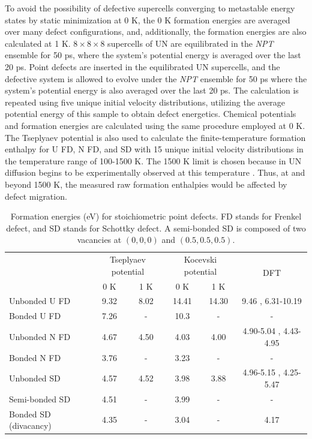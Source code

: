\documentclass[preprint, 12pt]{elsarticle}
\begin{document}
To avoid the possibility of defective supercells converging to metastable energy states by static minimization at 0 K, the 0 K formation energies are averaged over many defect configurations, and, additionally, the formation energies are also calculated at 1 K. $8 \times 8 \times 8$ supercells of UN are equilibrated in the \textit{NPT} ensemble for 50 ps, where the system's potential energy is averaged over the last 20 ps. Point defects are inserted in the equilibrated UN supercells, and the defective system is allowed to evolve under the \textit{NPT} ensemble for 50 ps where the system's potential energy is also averaged over the last 20 ps. The calculation is repeated using five unique initial velocity distributions, utilizing the average potential energy of this sample to obtain defect energetics. Chemical potentials and formation energies are calculated using the same procedure employed at 0 K. The Tseplyaev potential is also used to calculate the finite-temperature formation enthalpy for U FD, N FD, and SD with 15 unique initial velocity distributions in the temperature range of 100-1500 K. The 1500 K limit is chosen because in UN diffusion begins to be experimentally observed at this temperature \cite{Hayes1990III}. Thus, at and beyond 1500 K, the measured raw formation enthalpies would be affected by defect migration.

\begin{table}[h!]
    \centering
    \footnotesize
    \caption{Formation energies (eV) for stoichiometric point defects. FD stands for Frenkel defect, and SD stands for Schottky defect. A semi-bonded SD is composed of two vacancies at $(0, 0, 0)$ and $(0.5, 0.5, 0.5)$.}
    \label{Tab:StoicDef}
    \begin{tabular}{l|cc|cc|c}
    \hline
                & \multicolumn{2}{c|}{Tseplyaev potential}            & \multicolumn{2}{c|}{Kocevski potential}  & \multirow{2}{*}{DFT} \\
& 0 K & 1 K & 0 K & 1 K & \\
\hline
Unbonded U FD            & 9.32   & 8.02            & 14.41  & 14.30 & 9.46 \cite{Yang2021}, 6.31-10.19 \cite{Kocevski2022I} \\
Bonded U FD              & 7.26   & -               & 10.3   & -     & - \\
Unbonded N FD            & 4.67   & 4.50            & 4.03   & 4.00  & 4.90-5.04 \cite{Yang2021}, 4.43-4.95 \cite{Kocevski2022I} \\
Bonded N FD              & 3.76   & -               & 3.23   & -     & - \\
Unbonded SD              & 4.57   & 4.52            & 3.98   & 3.88  & 4.96-5.15 \cite{Yang2021}, 4.25-5.47 \cite{Kocevski2022I} \\
Semi-bonded SD           & 4.51   & -               & 3.99   & -     & - \\
Bonded SD (divacancy)    & 4.35   & -               & 3.04   & -     & 4.17 \cite{Yang2021} \\
    \hline
    \end{tabular}
\end{table}
\end{document}

